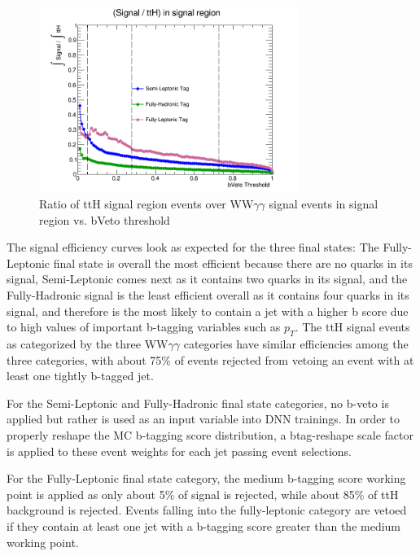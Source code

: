 \begin{figure}[H]
    \centering
    \includegraphics[width=0.75\textwidth]{Sections/HHWWgg/images/Objects/sigttHRatiovsbveto.png}
    \caption{Ratio of ttH signal region events over WW$\gamma\gamma$ signal events in signal region vs. bVeto threshold}
\label{fig:SigttHRatiovsbThresh}
\end{figure}

The signal efficiency curves look as expected for the three final states: The Fully-Leptonic final state is overall the most efficient because there are no quarks in its signal, Semi-Leptonic comes next
as it contains two quarks in its signal, and the Fully-Hadronic signal is the least efficient overall as it contains four quarks in its signal, and therefore is the most likely
to contain a jet with a higher b score due to high values of important b-tagging variables such as $p_{T}$. The ttH signal events as categorized by the three WW$\gamma\gamma$ categories have similar efficiencies among the three
categories, with about 75\% of events rejected from vetoing an event with at least one tightly b-tagged jet.

For the Semi-Leptonic and Fully-Hadronic final state categories, no b-veto is applied but rather is used as an input variable into DNN trainings. In order to properly reshape the MC b-tagging score distribution,
a btag-reshape scale factor is applied to these event weights for each jet passing event selections.

For the Fully-Leptonic final state category, the medium b-tagging score working point is applied as only about 5\% of signal is rejected, while about 85\% of ttH background is rejected.
Events falling into the fully-leptonic category are vetoed if they contain at least one jet with a b-tagging score greater than the medium working point.


